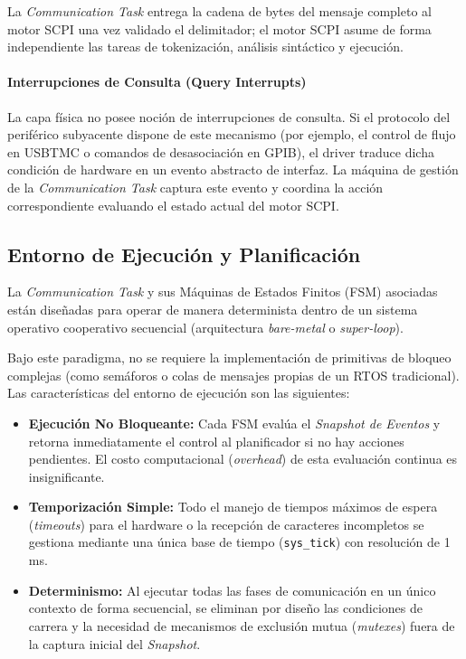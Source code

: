 La \textit{Communication Task} entrega la cadena de bytes del mensaje completo al motor SCPI una vez validado el delimitador; el motor SCPI asume de forma independiente las tareas de tokenización, análisis sintáctico y ejecución.

\paragraph{Interrupciones de Consulta (Query Interrupts)}

La capa física no posee noción de interrupciones de consulta. Si el protocolo del periférico subyacente dispone de este mecanismo (por ejemplo, el control de flujo en USBTMC o comandos de desasociación en GPIB), el driver traduce dicha condición de hardware en un evento abstracto de interfaz. La máquina de gestión de la \textit{Communication Task} captura este evento y coordina la acción correspondiente evaluando el estado actual del motor SCPI.

\subsection{Entorno de Ejecución y Planificación}
\label{subsec:entorno-ejecucion}

La \textit{Communication Task} y sus Máquinas de Estados Finitos (FSM) asociadas están diseñadas para operar de manera determinista dentro de un sistema operativo cooperativo secuencial (arquitectura \textit{bare-metal} o \textit{super-loop}). 

Bajo este paradigma, no se requiere la implementación de primitivas de bloqueo complejas (como semáforos o colas de mensajes propias de un RTOS tradicional). Las características del entorno de ejecución son las siguientes:

\begin{itemize}
    \item \textbf{Ejecución No Bloqueante:} Cada FSM evalúa el \textit{Snapshot de Eventos} y retorna inmediatamente el control al planificador si no hay acciones pendientes. El costo computacional (\textit{overhead}) de esta evaluación continua es insignificante.
    \item \textbf{Temporización Simple:} Todo el manejo de tiempos máximos de espera (\textit{timeouts}) para el hardware o la recepción de caracteres incompletos se gestiona mediante una única base de tiempo (\texttt{sys\_tick}) con resolución de 1\,ms.
    \item \textbf{Determinismo:} Al ejecutar todas las fases de comunicación en un único contexto de forma secuencial, se eliminan por diseño las condiciones de carrera y la necesidad de mecanismos de exclusión mutua (\textit{mutexes}) fuera de la captura inicial del \textit{Snapshot}.
\end{itemize}


